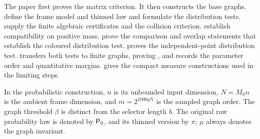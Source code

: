 The paper first proves the matrix criterion. It then constructs
the base graphs.  define the
frame model and thinned law and formulate the distribution tests.
 supply the finite
algebraic certificates and the collision criterion.
 establish compatibility on positive
mass. 
prove the comparison and overlap statements that establish the
coloured distribution test.  proves the
independent-point distribution test. 
transfers both tests to finite graphs, proving ,
and  records the parameter order and quantitative
margins.  gives the compact measure
constructions used in the limiting steps.

In the probabilistic construction, \(n\) is its unbounded input
dimension, \(N=M_0n\) is the ambient frame dimension, and
\(m=2^{1000gN}\) is the sampled graph order. The graph threshold
\(\beta\) is distinct from the selector length \(b\).
The original raw probability law is denoted by \({\mathsf P_0}\), and its
thinned version by \(\pi\); \(\mu\) always denotes the graph invariant.

